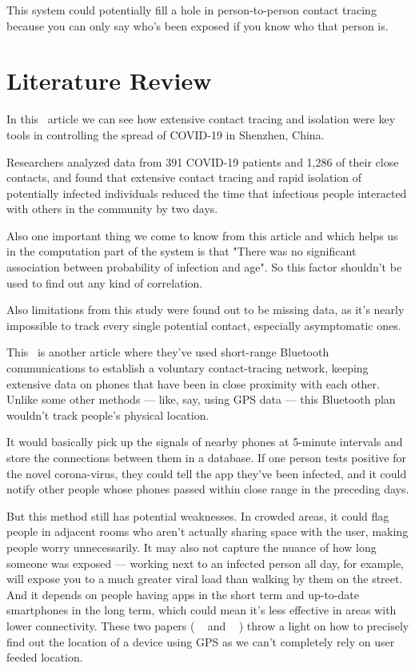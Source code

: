 \documentclass[10pt,twocolumn,letterpaper]{article}
\begin{document}
This system could potentially fill a hole in person-to-person contact tracing because you can only say who’s been exposed if you know who that person is.


\section{Literature Review}

In this~\cite{1} article we can see how extensive contact tracing and isolation were key tools in controlling the spread of COVID-19 in Shenzhen, China.

Researchers analyzed data from 391 COVID-19 patients and 1,286 of their close contacts, and found that extensive contact tracing and rapid isolation of potentially infected individuals reduced the time that infectious people interacted with others in the community by two days.

Also one important thing we come to know from this article and which helps us in the computation part of the system is that "There was no significant association between probability of infection and age". So this factor shouldn't be used to find out any kind of correlation.

Also limitations from this study were found out to be missing data, as it's nearly impossible to track every single potential contact, especially asymptomatic ones.

This~\cite{2} is another article where they've used short-range Bluetooth communications to establish a voluntary contact-tracing network, keeping extensive data on phones that have been in close proximity with each other. Unlike some other methods — like, say, using GPS data — this Bluetooth plan wouldn’t track people’s physical location.

It would basically pick up the signals of nearby phones at 5-minute intervals and store the connections between them in a database. If one person tests positive for the novel corona-virus, they could tell the app they’ve been infected, and it could notify other people whose phones passed within close range in the preceding days.

But this method still has potential weaknesses. In crowded areas, it could flag people in adjacent rooms who aren’t actually sharing space with the user, making people worry unnecessarily. It may also not capture the nuance of how long someone was exposed — working next to an infected person all day, for example, will expose you to a much greater viral load than walking by them on the street. And it depends on people having apps in the short term and up-to-date smartphones in the long term, which could mean it’s less effective in areas with lower connectivity.\newline\newline
These two papers ( ~\cite{3} and ~\cite{4} ) throw a light on how to precisely find out the location of a device using GPS as we can't completely rely on user feeded location.
\end{document}
